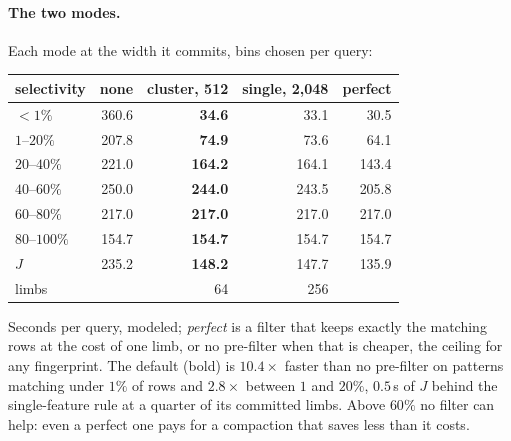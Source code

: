\paragraph{The two modes.}
Each mode at the width it commits, bins chosen per query:
\begin{center}
\setlength{\tabcolsep}{5pt}
\begin{tabular}{lrrrr}
  selectivity & none & cluster, 512 & single, 2{,}048 & perfect \\
  \hline
  $< 1\%$       & 360.6 & \textbf{34.6}  &  33.1 &  30.5 \\
  $1$--$20\%$   & 207.8 & \textbf{74.9}  &  73.6 &  64.1 \\
  $20$--$40\%$  & 221.0 & \textbf{164.2} & 164.1 & 143.4 \\
  $40$--$60\%$  & 250.0 & \textbf{244.0} & 243.5 & 205.8 \\
  $60$--$80\%$  & 217.0 & \textbf{217.0} & 217.0 & 217.0 \\
  $80$--$100\%$ & 154.7 & \textbf{154.7} & 154.7 & 154.7 \\
  \hline
  $J$           & 235.2 & \textbf{148.2} & 147.7 & 135.9 \\
  limbs         &       & 64             & 256   &
\end{tabular}
\end{center}
Seconds per query, modeled; \emph{perfect} is a filter that keeps
exactly the matching rows at the cost of one limb, or no pre-filter when
that is cheaper, the ceiling for any fingerprint. The default (bold) is
$10.4\times$ faster than no pre-filter on patterns matching under $1\%$
of rows and $2.8\times$ between $1$ and $20\%$, $0.5$\,s of $J$ behind
the single-feature rule at a quarter of its committed limbs. Above $60\%$
no filter can help: even a perfect one pays for a compaction that saves
less than it costs.

